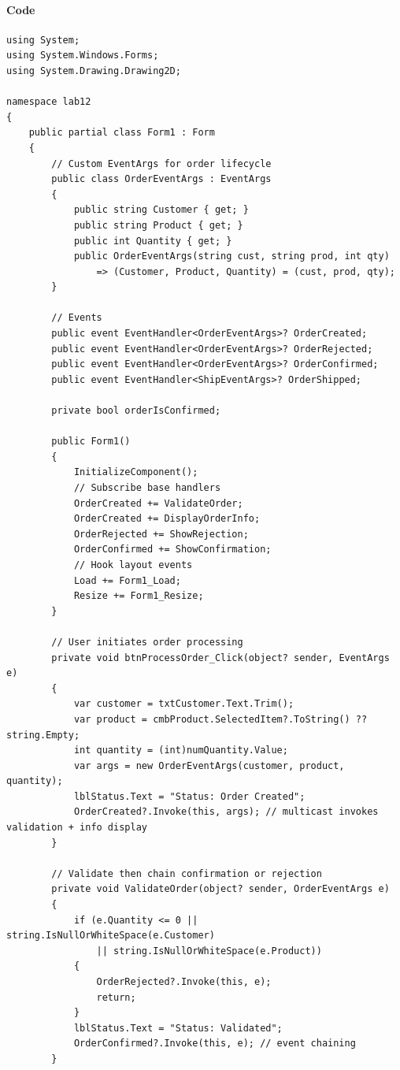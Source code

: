 \paragraph{Code}
\begin{lstlisting}[language=CSharp, caption={Complete Order Pipeline Implementation}]
using System;
using System.Windows.Forms;
using System.Drawing.Drawing2D;

namespace lab12
{
    public partial class Form1 : Form
    {
        // Custom EventArgs for order lifecycle
        public class OrderEventArgs : EventArgs
        {
            public string Customer { get; }
            public string Product { get; }
            public int Quantity { get; }
            public OrderEventArgs(string cust, string prod, int qty) 
                => (Customer, Product, Quantity) = (cust, prod, qty);
        }

        // Events
        public event EventHandler<OrderEventArgs>? OrderCreated;
        public event EventHandler<OrderEventArgs>? OrderRejected;
        public event EventHandler<OrderEventArgs>? OrderConfirmed;
        public event EventHandler<ShipEventArgs>? OrderShipped;

        private bool orderIsConfirmed;

        public Form1()
        {
            InitializeComponent();
            // Subscribe base handlers
            OrderCreated += ValidateOrder;
            OrderCreated += DisplayOrderInfo;
            OrderRejected += ShowRejection;
            OrderConfirmed += ShowConfirmation;
            // Hook layout events
            Load += Form1_Load;
            Resize += Form1_Resize;
        }

        // User initiates order processing
        private void btnProcessOrder_Click(object? sender, EventArgs e)
        {
            var customer = txtCustomer.Text.Trim();
            var product = cmbProduct.SelectedItem?.ToString() ?? string.Empty;
            int quantity = (int)numQuantity.Value;
            var args = new OrderEventArgs(customer, product, quantity);
            lblStatus.Text = "Status: Order Created";
            OrderCreated?.Invoke(this, args); // multicast invokes validation + info display
        }

        // Validate then chain confirmation or rejection
        private void ValidateOrder(object? sender, OrderEventArgs e)
        {
            if (e.Quantity <= 0 || string.IsNullOrWhiteSpace(e.Customer) 
                || string.IsNullOrWhiteSpace(e.Product))
            {
                OrderRejected?.Invoke(this, e);
                return;
            }
            lblStatus.Text = "Status: Validated";
            OrderConfirmed?.Invoke(this, e); // event chaining
        }


\end{lstlisting}
